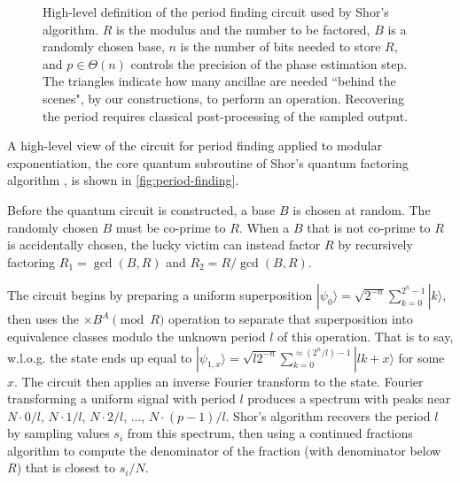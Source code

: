 \documentclass[twocolumn,longbibliography]{quantumarticle}
\begin{document}
\begin{figure}
  \centering
  \caption{
	High-level definition of the period finding circuit \cite{Shor1999} used by Shor's algorithm.
	$R$ is the modulus and the number to be factored, $B$ is a randomly chosen base, $n$ is the number of bits needed to store $R$, and $p \in \Theta(n)$ controls the precision of the phase estimation step.
    The triangles indicate how many ancillae are needed ``behind the scenes", by our constructions, to perform an operation.
	Recovering the period requires classical post-processing of the sampled output.
  }
  \label{fig:period-finding}
\end{figure}

A high-level view of the circuit for period finding applied to modular exponentiation, the core quantum subroutine of Shor's quantum factoring algorithm \cite{Shor1999}, is shown in \autoref{fig:period-finding}.

Before the quantum circuit is constructed, a base $B$ is chosen at random.
The randomly chosen $B$ must be co-prime to $R$.
When a $B$ that is not co-prime to $R$ is accidentally chosen, the lucky victim can instead factor $R$ by recursively factoring $R_1 = \gcd(B, R)$ and $R_2 = R / \gcd(B, R)$.

The circuit begins by preparing a uniform superposition $|\psi_0\rangle = \sqrt{2^{-n}} \sum_{k=0}^{2^n-1} |k\rangle$, then uses the $\times B^A {\pmod R}$ operation to separate that superposition into equivalence classes modulo the unknown period $l$ of this operation.
That is to say, w.l.o.g. the state ends up equal to $|\psi_{1,x}\rangle = \sqrt{l 2^{-n}} \sum_{k=0}^{\approx (2^n/l)-1} |l k + x \rangle$ for some $x$.
The circuit then applies an inverse Fourier transform to the state.
Fourier transforming a uniform signal with period $l$ produces a spectrum with peaks near $N \cdot 0/l$, $N \cdot 1/l$, $N \cdot 2/l$, ..., $N \cdot (p-1)/l$.
Shor's algorithm recovers the period $l$ by sampling values $s_i$ from this spectrum, then using a continued fractions algorithm to compute the denominator of the fraction (with denominator below $R$) that is closest to $s_i/N$.
\end{document}
